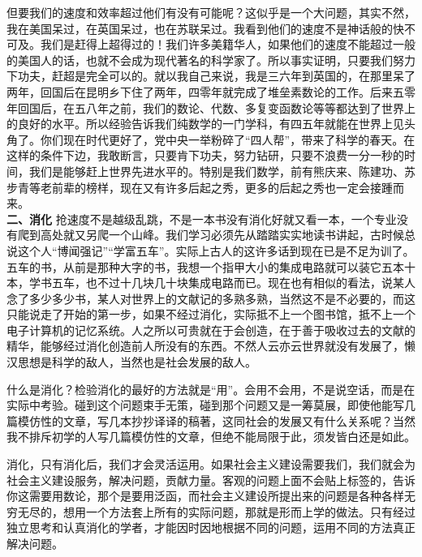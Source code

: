\documentclass[twoside,openright,headings=optiontohead]{ctexbook} %
\begin{document}
{但要我们的速度和效率超过他们有没有可能呢？这似乎是一个大问题，其实不然，我在美国呆过，在英国呆过，也在苏联呆过。我看到他们的速度不是神话般的快不可及。我们是赶得上超得过的！我们许多美籍华人，如果他们的速度不能超过一般的美国人的话，也就不会成为现代著名的科学家了。所以事实证明，只要我们努力下功夫，赶超是完全可以的。就以我自己来说，我是三六年到英国的，在那里呆了两年，回国后在昆明乡下住了两年，四零年就完成了堆垒素数论的工作。后来五零年回国后，在五八年之前，我们的数论、代数、多复变函数论等等都达到了世界上的良好的水平。所以经验告诉我们纯数学的一门学科，有四五年就能在世界上见头角了。你们现在时代更好了，党中央一举粉碎了``四人帮''，带来了科学的春天。在这样的条件下边，我敢断言，只要肯下功夫，努力钻研，只要不浪费一分一秒的时间，我们是能够赶上世界先进水平的。特别是我们数学，前有熊庆来、陈建功、苏步青等老前辈的榜样，现在又有许多后起之秀，更多的后起之秀也一定会接踵而来。\\
\textbf{二、消化}
抢速度不是越级乱跳，不是一本书没有消化好就又看一本，一个专业没有爬到高处就又另爬一个山峰。我们学习必须先从踏踏实实地读书讲起，古时候总说这个人``博闻强记''``学富五车''。实际上古人的这许多话到现在已是不足为训了。五车的书，从前是那种大字的书，我想一个指甲大小的集成电路就可以装它五本十本，学书五车，也不过十几块几十块集成电路而已。现在也有相似的看法，说某人念了多少多少书，某人对世界上的文献记的多熟多熟，当然这不是不必要的，而这只能说走了开始的第一步，如果不经过消化，实际抵不上一个图书馆，抵不上一个电子计算机的记忆系统。人之所以可贵就在于会创造，在于善于吸收过去的文献的精华，能够经过消化创造前人所没有的东西。不然人云亦云世界就没有发展了，懒汉思想是科学的敌人，当然也是社会发展的敌人。

什么是消化？检验消化的最好的方法就是``用''。会用不会用，不是说空话，而是在实际中考验。碰到这个问题束手无策，碰到那个问题又是一筹莫展，即使他能写几篇模仿性的文章，写几本抄抄译译的稿著，这同社会的发展又有什么关系呢？当然我不排斥初学的人写几篇模仿性的文章，但绝不能局限于此，须发皆白还是如此。

消化，只有消化后，我们才会灵活运用。如果社会主义建设需要我们，我们就会为社会主义建设服务，解决问题，贡献力量。客观的问题上面不会贴上标签的，告诉你这需要用数论，那个是要用泛函，而社会主义建设所提出来的问题是各种各样无穷无尽的，想用一个方法套上所有的实际问题，那就是形而上学的做法。只有经过独立思考和认真消化的学者，才能因时因地根据不同的问题，运用不同的方法真正解决问题。

}
\end{document}
